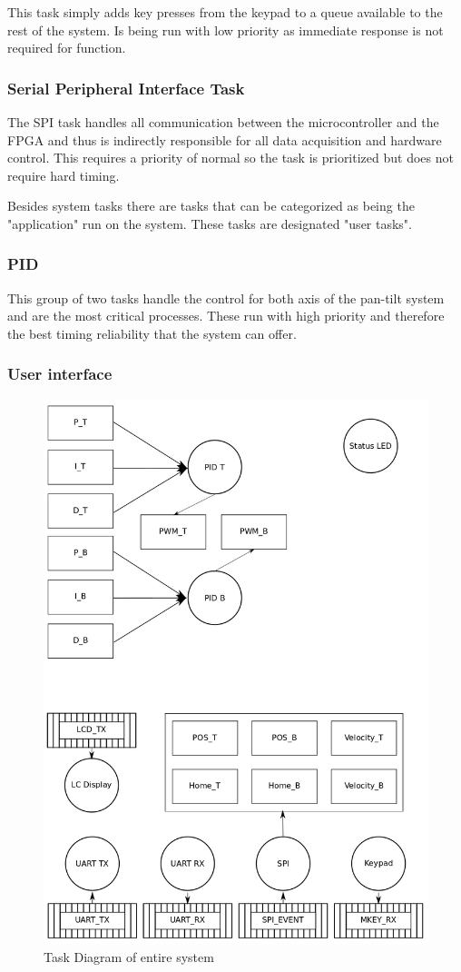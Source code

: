 \documentclass[../../../main]{subfiles}
\begin{document}
This task simply adds key presses from the keypad to a queue available to the rest of the system. Is being run with low priority as immediate response is not required for function.

\subsubsection{Serial Peripheral Interface Task}

The SPI task handles all communication between the microcontroller and the FPGA and thus is indirectly responsible for all data acquisition and hardware control. This requires a priority of normal so the task is prioritized but does not require hard timing.  

Besides system tasks there are tasks that can be categorized as being the "application" run on the system. These tasks are designated "user tasks".

\subsubsection{PID}

This group of two tasks handle the control for both axis of the pan-tilt system and are the most critical processes. These run with high priority and therefore the best timing reliability that the system can offer.

\subsubsection{User interface}


\begin{figure}[H]
\includegraphics[width=\columnwidth]{taskdiagram_full.png}
\caption{Task Diagram of entire system}
\label{fig:entire_task_diagram}
\end{figure}
\end{document}
